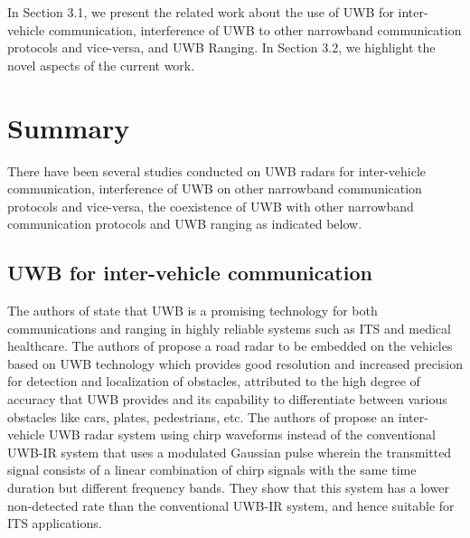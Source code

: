 
In Section 3.1, we present the related work about the use of UWB for inter-vehicle communication, interference of UWB to other narrowband communication protocols and vice-versa, and UWB Ranging. In Section 3.2, we highlight the novel aspects of the current work.

\section{Summary}
There have been several studies conducted on UWB radars for inter-vehicle communication, interference of UWB on other narrowband communication protocols and vice-versa, the coexistence of UWB with other narrowband communication protocols and UWB ranging as indicated below.

\subsection{UWB for inter-vehicle communication}

The authors of \cite{kohno2008latest} state that UWB is a promising technology for both communications and ranging in highly reliable systems such as ITS and medical healthcare. The authors of \cite{sakkila2008uwb} propose a road radar to be embedded on the vehicles based on UWB technology which provides good resolution and increased precision for detection and localization of obstacles, attributed to the high degree of accuracy that UWB provides and its capability to differentiate between various obstacles like cars, plates, pedestrians, etc. The authors of \cite{doi2004frequency} propose an inter-vehicle UWB radar system using chirp waveforms instead of the conventional UWB-IR system that uses a modulated Gaussian pulse wherein the transmitted signal consists of a linear combination of chirp signals with the same time duration but different frequency bands. They show that this system has a lower non-detected rate than the conventional UWB-IR system, and hence suitable for ITS applications. 

